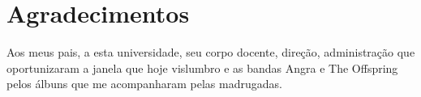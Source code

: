 \chapter*{Agradecimentos}

Aos meus pais, a esta universidade, seu corpo docente, direção, administração que oportunizaram a janela que hoje vislumbro e as bandas Angra e The Offspring pelos álbuns que me acompanharam pelas madrugadas.